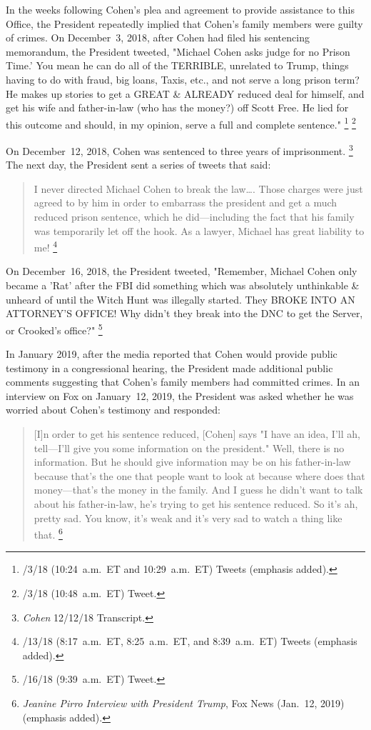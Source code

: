 In the weeks following Cohen's plea and agreement to provide assistance to this Office, the President repeatedly implied that Cohen's family members were guilty of crimes.
On December~3, 2018, after Cohen had filed his sentencing memorandum, the President tweeted, "Michael Cohen asks judge for no Prison Time.'
You mean he can do all of the TERRIBLE, unrelated to Trump, things having to do with fraud, big loans, Taxis, etc., and not serve a long prison term?
He makes up stories to get a GREAT \& ALREADY reduced deal for himself, and get his wife and father-in-law (who has the money?) off Scott Free.
He lied for this outcome and should, in my opinion, serve a full and complete sentence."%
\footnote{/3/18 (10:24~a.m.~ET and 10:29~a.m.~ET) Tweets (emphasis added).}
\footnote{/3/18 (10:48~a.m.~ET) Tweet.}

On December~12, 2018, Cohen was sentenced to three years of imprisonment.%
\footnote{\textit{Cohen} 12/12/18 Transcript.}
The next day, the President sent a series of tweets that said:

\begin{quote}
I never directed Michael Cohen to break the law\dots.
Those charges were just agreed to by him in order to embarrass the president and get a much reduced prison sentence, which he did---including the fact that his family was temporarily let off the hook.
As a lawyer, Michael has great liability to me!%
\footnote{/13/18 (8:17~a.m.~ET, 8:25~a.m.~ET, and 8:39~a.m.~ET) Tweets (emphasis added).}
\end{quote}

On December~16, 2018, the President tweeted, "Remember, Michael Cohen only became a 'Rat' after the FBI did something which was absolutely unthinkable \& unheard of until the Witch Hunt was illegally started.
They BROKE INTO AN ATTORNEY'S OFFICE!
Why didn't they break into the DNC to get the Server, or Crooked's office?"%
\footnote{/16/18 (9:39~a.m.~ET) Tweet.}

In January 2019, after the media reported that Cohen would provide public testimony in a congressional hearing, the President made additional public comments suggesting that Cohen's family members had committed crimes.
In an interview on Fox on January~12, 2019, the President was asked whether he was worried about Cohen's testimony and responded:

\begin{quote}
[I]n order to get his sentence reduced, [Cohen] says "I have an idea, I'll ah, tell---I'll give you some information on the president."
Well, there is no information.
But he should give information may be on his father-in-law because that's the one that people want to look at because where does that money---that's the money in the family.
And I guess he didn't want to talk about his father-in-law, he's trying to get his sentence reduced.
So it's ah, pretty sad.
You know, it's weak and it's very sad to watch a thing like that.%
\footnote{\textit{Jeanine Pirro Interview with President Trump}, Fox News (Jan.~12, 2019) (emphasis added).}
\end{quote}

